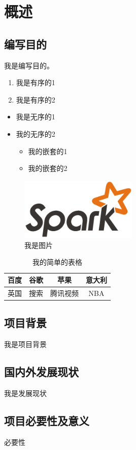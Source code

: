 \newpage
\section{概述}
\subsection{编写目的}
我是编写目的。

\begin{enumerate}
\item 我是有序的1
\item 我是有序的2
\end{enumerate}

\begin{itemize}
\item 我是无序的1
\item 我的无序的2
  \begin{itemize}
  \item 我的嵌套的1
  \item 我的嵌套的2
  \end{itemize}
\end{itemize}

\begin{figure}[h]
\centering
\includegraphics[width=0.5\textwidth]{spark-logo}
\caption{我是图片}
\end{figure}

\begin{table}[h]
\centering
 \begin{tabular}{|c|c|c|c|}
 \hline
 百度 & 谷歌 & 苹果 & 意大利  \\
 \hline
 英国 & 搜索 & 腾讯视频 & NBA \\
 \hline
 \end{tabular}
 \caption{我的简单的表格}
 \end{table}

\subsection{项目背景}
我是项目背景

\subsection{国内外发展现状}
我是发展现状

\subsection{项目必要性及意义}
必要性
